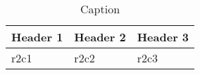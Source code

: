 \begin{table}[htb!]
  \caption{Caption}
  \label{table:label}
  \centering
  \begin{tabular}{lll}
    \toprule
    \textbf{Header 1} & \textbf{Header 2} & \textbf{Header 3}\\
    \midrule
                 r2c1 &              r2c2 &              r2c3\\
    \bottomrule
  \end{tabular}
\end{table}
